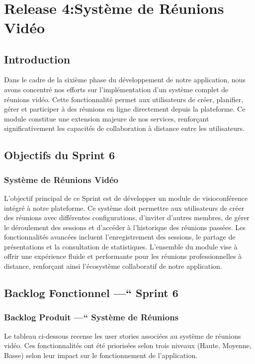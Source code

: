 ﻿﻿\chapter{Release 4:Système de Réunions Vidéo}

\DeclareRobustCommand{\greencheck}{%
  \tikz\fill[scale=0.4, color=green]
  (0,.35) -- (.25,0) -- (1,.7) -- (.25,.15) -- cycle;%
}

\minitoc
\newpage
\section*{Introduction}
Dans le cadre de la sixième phase du développement de notre application, nous avons concentré nos efforts sur l'implémentation d'un système complet de réunions vidéo. Cette fonctionnalité permet aux utilisateurs de créer, planifier, gérer et participer à des réunions en ligne directement depuis la plateforme. Ce module constitue une extension majeure de nos services, renforçant significativement les capacités de collaboration à distance entre les utilisateurs.

\section{Objectifs du Sprint 6}

\subsection{Système de Réunions Vidéo}
L'objectif principal de ce Sprint est de développer un module de visioconférence intégré à notre plateforme. Ce système doit permettre aux utilisateurs de créer des réunions avec différentes configurations, d'inviter d'autres membres, de gérer le déroulement des sessions et d'accéder à l'historique des réunions passées. Les fonctionnalités avancées incluent l'enregistrement des sessions, le partage de présentations et la consultation de statistiques. L'ensemble du module vise à offrir une expérience fluide et performante pour les réunions professionnelles à distance, renforçant ainsi l'écosystème collaboratif de notre application.

\section{Backlog Fonctionnel —“ Sprint 6}

\subsection{Backlog Produit —“ Système de Réunions}
Le tableau ci-dessous recense les user stories associées au système de réunions vidéo. Ces fonctionnalités ont été priorisées selon trois niveaux (Haute, Moyenne, Basse) selon leur impact sur le fonctionnement de l'application.

